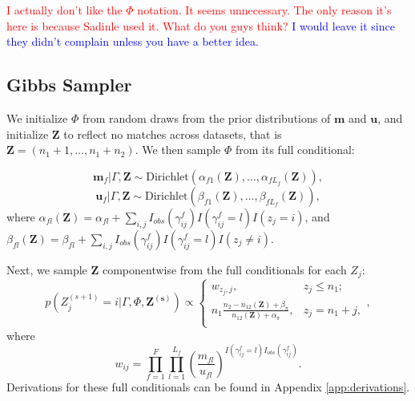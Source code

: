 \documentclass[ba]{imsart}
\begin{document}
\textcolor{red}{I actually don't like the $\Phi$ notation. It seems unnecessary. The only reason it's here is because Sadinle used it. What do you guys think?}
\textcolor{blue}{I would leave it since they didn't complain unless you have a better idea.}

\hypertarget{posterior-sampling}{%
	\subsection{Gibbs Sampler}
	\label{gibbs_sampling}}

We initialize $\Phi$ from random draws from the prior distributions of $\bm{m}$ and $\bm{u}$, and initialize $\bm{Z}$ to reflect no matches across datasets, that is $\bm{Z} = (n_1 + 1, \ldots, n_1 + n_2)$. We then sample $\Phi$ from its full conditional:

$$\bm{m}_f|\Gamma, \bm{Z} \sim \text{Dirichlet}(\alpha_{f1}(\bm{Z}), \ldots, \alpha_{fL_f}(\bm{Z})),$$
$$\bm{u}_f|\Gamma, \bm{Z} \sim \text{Dirichlet}(\beta_{f1}(\bm{Z}), \ldots, \beta_{fL_f}(\bm{Z})),$$
where $\alpha_{fl}(\bm{Z})= \alpha_{fl} + \sum_{i,j} I_{obs}(\gamma_{ij}^f)I(\gamma_{ij}^f = l) I(z_j = i)$, and $\beta_{fl}(\bm{Z})= \beta_{fl} + \sum_{i,j} I_{obs}(\gamma_{ij}^f)I(\gamma_{ij}^f = l) I(z_j \neq i)$.

Next, we sample $\bm{Z}$ componentwise from the full conditionals for each $Z_j$:
$$p\left(Z_j^{(s+1)}  = i|\Gamma, \Phi, \bm{Z^{(s)}}\right) \propto
\begin{cases} 
	w_{z_j, j},  & z_j \leq n_1; \\
	n_1 \frac{n_2 - n_{12}(\bm{Z}) + \beta_{\pi}}{n_{12}(\bm{Z}) + \alpha_{\pi}}, & z_j  = n_1 + j, \\
\end{cases},$$
where 
$$w_{ij} = \prod_{f=1}^{F}\prod_{l = 1}^{L_f} \left(\frac{m_{fl}}{u_{fl}}\right)^{I(\gamma_{ij}^f = l)I_{obs}(\gamma_{ij}^f)}.$$
Derivations for these full conditionals can be found in Appendix \ref{app:derivations}.

%
\end{document}
